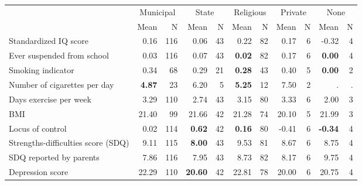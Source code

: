 \begin{tabular}{l r r r r r r r r r r}
\toprule
& \multicolumn{2}{c}{Municipal} & \multicolumn{2}{c}{State} & \multicolumn{2}{c}{Religious} & \multicolumn{2}{c}{Private} & \multicolumn{2}{c}{None} \\
& \scriptsize Mean & \scriptsize N & \scriptsize Mean & \scriptsize N & \scriptsize Mean & \scriptsize N & \scriptsize Mean & \scriptsize N & \scriptsize Mean & \scriptsize N \\
\midrule
Standardized IQ score &      0.16 &       116 &      0.06 &        43 &      0.22 &        82 &      0.17 &         6 &     -0.32 &         4 \\
Ever suspended from school &      0.03 &       116 &      0.07 &        43 & \textbf{     0.02} &        82 &      0.17 &         6 & \textbf{     0.00} &         4 \\
Smoking indicator &      0.34 &        68 &      0.29 &        21 & \textbf{     0.28} &        43 &      0.40 &         5 & \textbf{     0.00} &         2 \\
Number of cigarettes per day & \textbf{     4.87} &        23 &      6.20 &         5 & \textbf{     5.25} &        12 &      7.50 &         2 &         . & . \\
Days exercise per week &      3.29 &       110 &      2.74 &        43 &      3.15 &        80 &      3.33 &         6 &      2.00 &         3 \\
BMI &     21.40 &        99 &     21.66 &        42 &     21.28 &        74 &     20.10 &         5 &     21.99 &         3 \\
Locus of control &      0.02 &       114 & \textbf{     0.62} &        42 & \textbf{     0.16} &        80 &     -0.41 &         6 & \textbf{    -0.34} &         4 \\
Strengths-difficulties score (SDQ) &      9.11 &       115 & \textbf{     8.00} &        43 &      9.53 &        81 &      8.67 &         6 &      8.75 &         4 \\
SDQ reported by parents &      7.86 &       116 &      7.95 &        43 &      8.73 &        82 &      8.17 &         6 &      9.75 &         4 \\
Depression score &     22.29 &       110 & \textbf{    20.60} &        42 &     22.81 &        78 &     20.00 &         6 &     20.75 &         4 \\
\bottomrule
\end{tabular}
